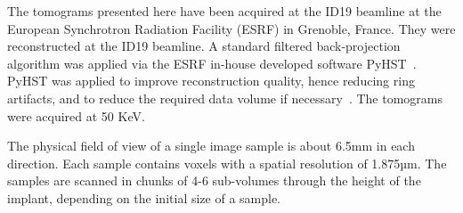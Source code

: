 The tomograms presented here have been acquired at the ID19 beamline at the
European Synchrotron Radiation Facility (ESRF) in Grenoble, France. They were
reconstructed\citep{sporring} at the ID19 beamline. A standard filtered
back-projection algorithm was applied via the ESRF in-house developed software
PyHST~\citep{NELDAM2015682,pyhst}. PyHST was applied to improve reconstruction
quality, hence reducing ring artifacts, and to reduce the required data volume
if necessary~\cite{MIRONE201441}. The tomograms were acquired at 50 KeV.

The physical field of view of a single image sample is about 6.5mm in each
direction. Each sample contains voxels with a spatial resolution of 1.875µm.
The samples are scanned in chunks of 4-6 sub-volumes through the height of the
implant, depending on the initial size of a sample.

